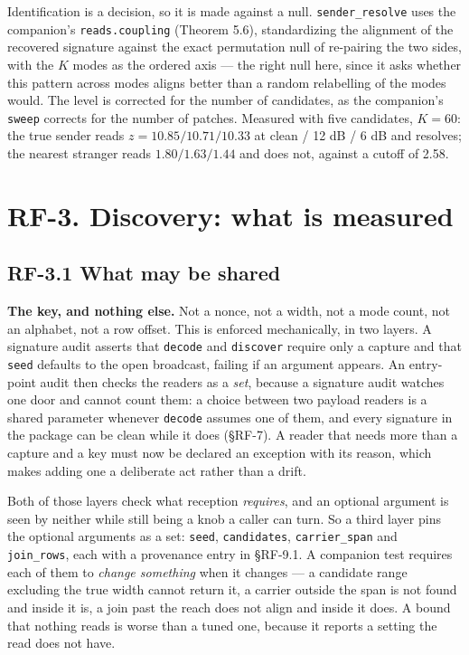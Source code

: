 \documentclass[10pt,letterpaper,twocolumn]{article}
\begin{document}
Identification is a decision, so it is made against a null. \texttt{sender\_\allowbreak{}resolve} uses the companion's \texttt{reads.\allowbreak{}coupling} (Theorem 5.6), standardizing the alignment of the recovered signature against the exact permutation null of re-pairing the two sides, with the \(K\) modes as the ordered axis --- the right null here, since it asks whether this pattern across modes aligns better than a random relabelling of the modes would. The level is corrected for the number of candidates, as the companion's \texttt{sweep} corrects for the number of patches. Measured with five candidates, \(K=60\): the true sender reads \(z = 10.85 / 10.71 / 10.33\) at clean / 12 dB / 6 dB and resolves; the nearest stranger reads \(1.80 / 1.63 / 1.44\) and does not, against a cutoff of 2.58.

\section{RF-3. Discovery: what is measured}\label{rf-3-discovery-what-is-measured}

\subsection{RF-3.1 What may be shared}\label{rf-31-what-may-be-shared}

\textbf{The key, and nothing else.} Not a nonce, not a width, not a mode count, not an alphabet, not a row offset. This is enforced mechanically, in two layers. A signature audit asserts that \texttt{decode} and \texttt{discover} require only a capture and that \texttt{seed} defaults to the open broadcast, failing if an argument appears. An entry-point audit then checks the readers as a \emph{set}, because a signature audit watches one door and cannot count them: a choice between two payload readers is a shared parameter whenever \texttt{decode} assumes one of them, and every signature in the package can be clean while it does (§RF-7). A reader that needs more than a capture and a key must now be declared an exception with its reason, which makes adding one a deliberate act rather than a drift.

Both of those layers check what reception \emph{requires}, and an optional argument is seen by neither while still being a knob a caller can turn. So a third layer pins the optional arguments as a set: \texttt{seed}, \texttt{candidates}, \texttt{carrier\_\allowbreak{}span} and \texttt{join\_\allowbreak{}rows}, each with a provenance entry in §RF-9.1. A companion test requires each of them to \emph{change something} when it changes --- a candidate range excluding the true width cannot return it, a carrier outside the span is not found and inside it is, a join past the reach does not align and inside it does. A bound that nothing reads is worse than a tuned one, because it reports a setting the read does not have.
\end{document}
